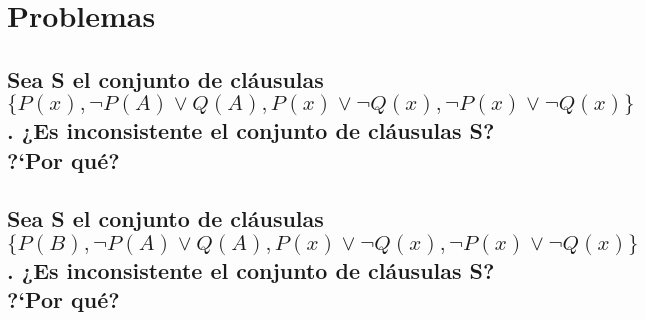 \documentclass[10pt, a4paper,spanish]{article}
\begin{document}
	\section{Problemas}

		\subsection{Sea S el conjunto de cláusulas $ \{ P(x), \lnot P(A) \lor Q(A), P(x) \lor \lnot Q(x), \lnot P(x) \lor \lnot Q(x) \} $. ¿Es inconsistente el conjunto de cláusulas S? ?`Por qué?}

			\paragraph{}


		\subsection{Sea S el conjunto de cláusulas $ \{ P(B), \lnot P(A) \lor Q(A), P(x) \lor \lnot Q(x), \lnot P(x) \lor \lnot Q(x) \} $. ¿Es inconsistente el conjunto de cláusulas S? ?`Por qué?}

			\paragraph{}
\end{document}
